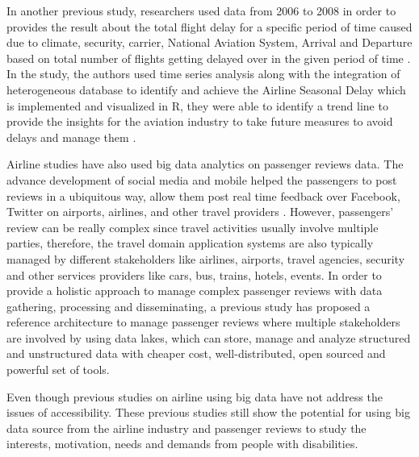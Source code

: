 In another previous study, researchers used data from 2006 to 2008 in order 
to provides the result about the total flight delay for a specific period of 
time caused due to climate, security, carrier, National Aviation System, Arrival
and Departure based on total number of flights getting delayed over in the 
given period of time \cite{Sor}. In the study, the authors used time series 
analysis along with the integration of heterogeneous database to identify and 
achieve the Airline Seasonal Delay which is implemented and visualized in R, 
they were able to identify a trend line to provide the insights for the aviation
industry to take future measures to avoid delays and manage them \cite{Sor}.

Airline studies have also used big data analytics on passenger reviews data.
The advance development of social media and mobile helped the passengers to 
post reviews in a ubiquitous way, allow them post real time feedback over 
Facebook, Twitter on airports, airlines, and other travel providers
\cite{CHEN2016285}. However, passengers' review can be really complex 
since travel activities usually involve multiple parties, therefore, the
travel domain application systems are also typically managed by different 
stakeholders like airlines, airports, travel agencies, security and other 
services providers like cars, bus, trains, hotels, events. In order to 
provide a holistic approach to manage complex passenger reviews with data 
gathering, processing and disseminating, a previous study has proposed a 
reference architecture to manage passenger reviews where multiple 
stakeholders are involved by using data lakes, which can store, manage 
and analyze structured and unstructured data with cheaper cost, 
well-distributed, open sourced and powerful set of tools.

Even though previous studies on airline using big data have not address the issues 
of accessibility. These previous studies still show the potential for using big data 
source from the airline industry and passenger reviews to study the interests, 
motivation, needs and demands from people with disabilities.



